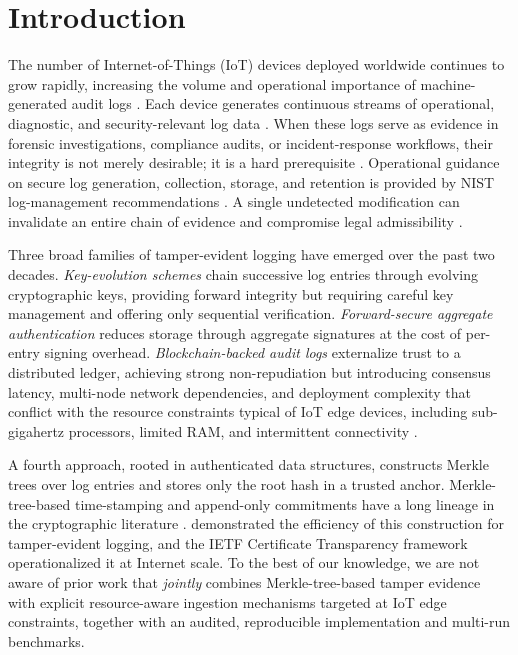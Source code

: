 \documentclass[preprint,12pt]{elsarticle}
\begin{document}
\section{Introduction}
\label{sec:intro}

The number of Internet-of-Things (IoT) devices deployed worldwide continues to grow rapidly, increasing the volume and operational importance of machine-generated audit logs \citep{hassan2019survey,nist2020iot,ali2018blockchain,lin2017survey}.
Each device generates continuous streams of operational, diagnostic, and security-relevant log data \citep{li2017iot,alaba2017internet}.
When these logs serve as evidence in forensic investigations, compliance audits, or incident-response workflows, their integrity is not merely desirable; it is a hard prerequisite \citep{kebande2017cloud,nist80061r2,nist80086,iso27037}.
Operational guidance on secure log generation, collection, storage, and retention is provided by NIST log-management recommendations \citep{nist80092}.
A single undetected modification can invalidate an entire chain of evidence and compromise legal admissibility \citep{nist80086,iso27037,stoyanova2020survey}.

Three broad families of tamper-evident logging have emerged over the past two decades.
\emph{Key-evolution schemes} \citep{schneier1999secure} chain successive log entries through evolving cryptographic keys, providing forward integrity but requiring careful key management and offering only sequential verification.
\emph{Forward-secure aggregate authentication} \citep{ma2009new,yavuz2012efficient} reduces storage through aggregate signatures at the cost of per-entry signing overhead.
\emph{Blockchain-backed audit logs} \citep{putz2019secure,ahmad2019blockaudit} externalize trust to a distributed ledger, achieving strong non-repudiation but introducing consensus latency, multi-node network dependencies, and deployment complexity that conflict with the resource constraints typical of IoT edge devices, including sub-gigahertz processors, limited RAM, and intermittent connectivity \citep{hassan2019survey,nist2020iot}.

A fourth approach, rooted in authenticated data structures, constructs Merkle trees \citep{merkle1987digital} over log entries and stores only the root hash in a trusted anchor.
Merkle-tree-based time-stamping and append-only commitments have a long lineage in the cryptographic literature \citep{haber1991timestamp,bayer1993timestamp}.
\citet{crosby2009efficient} demonstrated the efficiency of this construction for tamper-evident logging, and the IETF Certificate Transparency framework \citep{rfc9162} operationalized it at Internet scale.
To the best of our knowledge, we are not aware of prior work that \emph{jointly} combines Merkle-tree-based tamper evidence with explicit resource-aware ingestion mechanisms targeted at IoT edge constraints, together with an audited, reproducible implementation and multi-run benchmarks.
\end{document}
